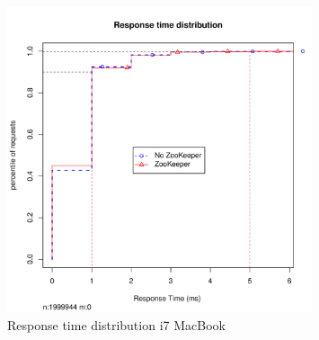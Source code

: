 \begin{figure}[h]
    \centering
    \includegraphics[width=0.8\textwidth]{results/distribution/distribution_eivind}
    \caption{Response time distribution i7 MacBook}
    \label{fig:dist_knut}
\end{figure}








